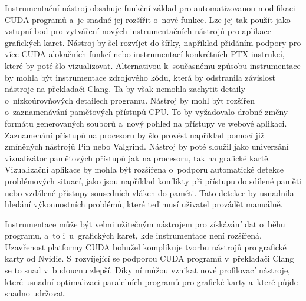 Instrumentační nástroj obsahuje funkční základ pro automatizovanou modifikaci CUDA programů a~je snadné jej rozšířit o~nové funkce. Lze jej tak použít jako vstupní bod pro vytváření nových instrumentačních nástrojů pro aplikace grafických karet. Nástroj by šel rozvíjet do šířky, například přidáním podpory pro více CUDA alokačních funkcí nebo instrumentací konkrétních PTX instrukcí, které by poté šlo vizualizovat. Alternativou k~současnému způsobu instrumentace by mohla být instrumentace zdrojového kódu, která by odstranila závislost nástroje na překladači Clang. Ta by však nemohla zachytit detaily o~nízkoúrovňových detailech programu.
Nástroj by mohl být rozšířen o~zaznamenávání paměťových přístupů CPU. To by vyžadovalo drobné změny formátu generovaných souborů a~nový pohled na přístupy ve webové aplikaci. Zaznamenání přístupů na procesoru by šlo provést například pomocí již zmíněných nástrojů Pin\cite{pin} nebo Valgrind\cite{valgrind}. Nástroj by poté sloužil jako univerzání vizualizátor paměťových přístupů jak na procesoru, tak na grafické kartě. Vizualizační aplikace by mohla být rozšířena o~podporu automatické detekce problémových situací, jako jsou například konflikty při přístupu do sdílené paměti nebo vzdálené přístupy sousedních vláken do paměti. Tato detekce by usnadnila hledání výkonnostních problémů, které teď musí uživatel provádět manuálně.

Instrumentace může být velmi užitečným nástrojem pro získávání dat o~běhu programu, a~to i~u~grafických karet, kde instrumentace není rozšířená. Uzavřenost platformy CUDA bohužel komplikuje tvorbu nástrojů pro grafické karty od Nvidie. S~rozvíjející se podporou CUDA programů v~překladači Clang se to snad v~budoucnu zlepší. Díky ní můžou vznikat nové profilovací nástroje, které usnadní optimalizaci paralelních programů pro grafické karty a~které půjde snadno udržovat.
